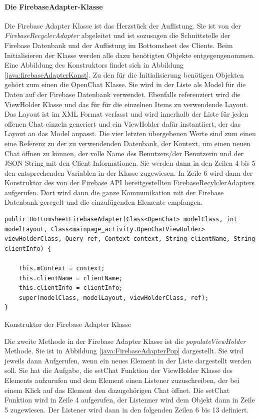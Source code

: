 \documentclass[a4paper,11pt]{report}
\newenvironment{code}{\captionsetup{type=figure}}{}
\begin{document}
			\paragraph{Die FirebaseAdapter-Klasse}\label{firebaseAdapter}		
			Die Firebase Adapter Klasse ist das Herzstück der Auflistung. Sie ist von der \emph{FirebaseRecyclerAdapter} abgeleitet und ist sozusagen die Schnittstelle der Firebase Datenbank und der Auflistung im Bottomsheet des Clients. Beim Initialisieren der Klasse werden alle dazu benötigten Objekte entgegengenommen. Eine Abbildung des Konstruktors findet sich in Abbildung \ref{java:firebaseAdapterKonst}. Zu den für die Initialisierung benötigen Objekten gehört zum einen die OpenChat Klasse. Sie wird in der Liste als Model für die Daten auf der Firebase Datenbank verwendet. Ebenfalls referenziert wird die ViewHolder Klasse und das für für die einzelnen Items zu verwendende Layout. Das Layout ist im XML Format verfasst und wird innerhalb der Liste für jeden offenen Chat einzeln generiert und ein ViewHolder dafür instantiiert, der das Layout an das Model anpasst. Die vier letzten übergebenen Werte sind zum einen eine Referenz zu der zu verwendenden Datenbank, der Kontext, um einen neuen Chat öffnen zu können, der volle Name des Benutzers/der Benutzerin und der JSON String mit den Client Informationen. Sie werden dann in den Zeilen 4 bis 5 den entsprechenden Variablen in der Klasse zugewiesen. In Zeile 6 wird dann der Konstruktor des von der Firebase API bereitgestellten FirebaseRecylclerAdapters aufgerufen. Dort wird dann die ganze Kommunikation mit der Firebase Datenbank geregelt und die einzufügenden Elemente empfangen.
\begin{code}
	\begin{center}
		\begin{verbatim}
public BottomsheetFirebaseAdapter(Class<OpenChat> modelClass, int modelLayout, Class<mainpage_activity.OpenChatViewHolder> viewHolderClass, Query ref, Context context, String clientName, String clientInfo) {
	
	this.mContext = context;
	this.clientName = clientName;
	this.clientInfo = clientInfo;
	super(modelClass, modelLayout, viewHolderClass, ref);
}
		\end{verbatim}
		\caption{Konstruktor der Firebase Adapter Klasse}\label{java:firebaseAdapterKonst}
	\end{center}
\end{code}

			Die zweite Methode in der Firebase Adapter Klasse ist die \emph{populateViewHolder} Methode. Sie ist in Abbildung \ref{java:FirebaseAdapterPop} dargestellt. Sie wird jeweils dann Aufgerufen, wenn ein neues Element in der Liste dargestellt werden soll. Sie hat die Aufgabe, die setChat Funktion der ViewHolder Klasse des Elements aufzurufen und dem Element einen Listener zuzuschreiben, der bei einem Klick auf das Element den dazugehörigen Chat öffnet. Die setChat Funktion wird in Zeile 4 aufgerufen, der Listenner wird dem Objekt dann in Zeile 5 zugewiesen. Der Listener wird dann in den folgenden Zeilen 6 bis 13 definiert.
			
\end{document}
